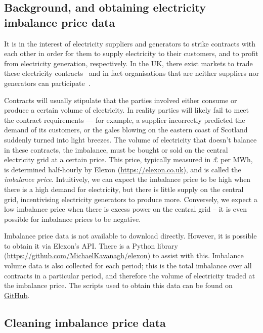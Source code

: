 \documentclass[11pt,twoside,openany]{book}
\numberwithin{Theorem}{chapter}
\numberwithin{Definition}{chapter}
\numberwithin{Lemma}{chapter}
\numberwithin{Algorithm}{chapter}
\numberwithin{equation}{chapter}
\begin{document}
\subsection{Background, and obtaining electricity imbalance price data}


It is in the interest of electricity suppliers and generators to strike
contracts with each other in order for them to supply electricity to their
customers, and to profit from electricity generation, respectively. In the UK,
there exist markets to trade these electricity contracts~\citep{liu2022evolution}
and in fact organisations that are neither suppliers nor generators can
participate~\citep{https://www.elexon.co.uk/about/bsc-explained/}.

Contracts will usually stipulate that the parties involved either consume or
produce a certain volume of electricity. In reality parties will likely fail to
meet the contract requirements --- for example, a supplier incorrectly predicted the demand of its customers,
or the gales blowing on the eastern coast of Scotland suddenly turned into
light breezes. The volume of electricity that doesn't balance in these
contracts, the imbalance, must be bought or sold on the central
electricity grid at a certain price. This price, typically
measured in £ per MWh, is determined half-hourly by
Elexon (\url{https://elexon.co.uk}), and is called the {\it imbalance price}.
Intuitively, we can expect the imbalance price to be high when there is
a high demand for electricity, but there is little supply on the central grid,
incentivising electricity generators to produce more. Conversely, we expect
a low imbalance price when there is excess power on the central grid -- it is even
possible for imbalance prices to be negative.

Imbalance price data is not available to download directly. However, it is
possible to obtain it via Elexon's API. There is a Python library
(\url{https://github.com/MichaelKavanagh/elexon}) to assist with this.
Imbalance volume data is also collected for each period; this is
the total imbalance over all contracts in a particular period, and therefore
the volume of electricity traded at the imbalance price. The
scripts used
to obtain this data can be found on
\href{https://github.com/lippirk/edi-diss/blob/main/elexon-scrape}{GitHub}.


\subsection{Cleaning imbalance price data}\label{sec:cleaning_imbalance}
\end{document}
